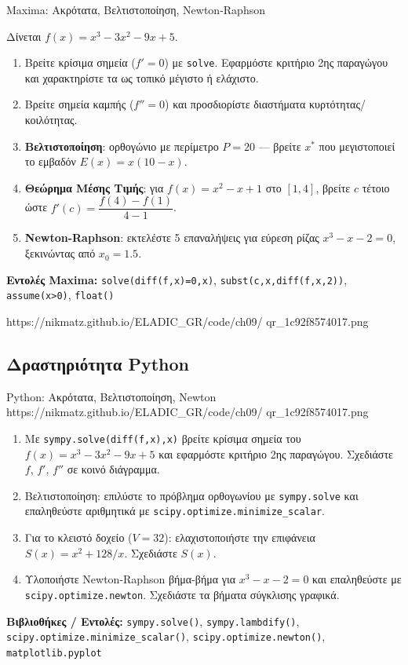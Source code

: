 %

\casactivbox%
  {Maxima: Ακρότατα, Βελτιστοποίηση, Newton-Raphson}%
  {%
    \label{cas:ch9_deriv_apps}
    Δίνεται $f(x)=x^3-3x^2-9x+5$.
    \begin{enumerate}[label=(\alph*),itemsep=2pt]
      \item Βρείτε κρίσιμα σημεία ($f'=0$) με \texttt{solve}.
        Εφαρμόστε κριτήριο 2ης παραγώγου και χαρακτηρίστε τα
        ως τοπικό μέγιστο ή ελάχιστο.
      \item Βρείτε σημεία καμπής ($f''=0$) και προσδιορίστε
        διαστήματα κυρτότητας/κοιλότητας.
      \item \textbf{Βελτιστοποίηση}: ορθογώνιο με περίμετρο $P=20$ —
        βρείτε $x^*$ που μεγιστοποιεί το εμβαδόν $E(x)=x(10-x)$.
      \item \textbf{Θεώρημα Μέσης Τιμής}: για $f(x)=x^2-x+1$
        στο $[1,4]$, βρείτε $c$ τέτοιο ώστε
        $f'(c)=\dfrac{f(4)-f(1)}{4-1}$.
      \item \textbf{Newton-Raphson}: εκτελέστε 5 επαναλήψεις
        για εύρεση ρίζας $x^3-x-2=0$, ξεκινώντας από $x_0=1.5$.
    \end{enumerate}
    \smallskip
    \textbf{Εντολές Maxima:}
    \texttt{solve(diff(f,x)=0,x)}, \texttt{subst(c,x,diff(f,x,2))},
    \texttt{assume(x>0)}, \texttt{float()}
  }%
  {https://nikmatz.github.io/ELADIC_GR/code/ch09/}%
  {qr_1c92f8574017.png}

\subsection*{Δραστηριότητα Python}

\begin{pybox}{Python: Ακρότατα, Βελτιστοποίηση, Newton}%
             {https://nikmatz.github.io/ELADIC_GR/code/ch09/}%
             {qr_1c92f8574017.png}
\label{py:ch9_deriv_apps}
\begin{enumerate}[label=(\alph*),itemsep=2pt]
  \item Με \texttt{sympy.solve(diff(f,x),x)} βρείτε κρίσιμα
    σημεία του $f(x)=x^3-3x^2-9x+5$ και εφαρμόστε κριτήριο
    2ης παραγώγου. Σχεδιάστε $f$, $f'$, $f''$ σε κοινό διάγραμμα.
  \item Βελτιστοποίηση: επιλύστε το πρόβλημα ορθογωνίου
    με \texttt{sympy.solve} και επαληθεύστε αριθμητικά με
    \texttt{scipy.optimize.minimize\_scalar}.
  \item Για το κλειστό δοχείο ($V=32$): ελαχιστοποιήστε την
    επιφάνεια $S(x)=x^2+128/x$. Σχεδιάστε $S(x)$.
  \item Υλοποιήστε Newton-Raphson βήμα-βήμα για $x^3-x-2=0$
    και επαληθεύστε με \texttt{scipy.optimize.newton}.
    Σχεδιάστε τα βήματα σύγκλισης γραφικά.
\end{enumerate}
\medskip
\textbf{Βιβλιοθήκες / Εντολές:}
\texttt{sympy.solve()}, \texttt{sympy.lambdify()},
\texttt{scipy.optimize.minimize\_scalar()},
\texttt{scipy.optimize.newton()}, \texttt{matplotlib.pyplot}
\end{pybox}
